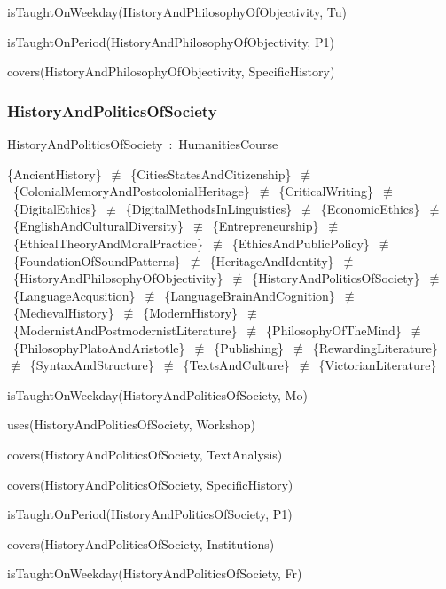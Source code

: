 \documentclass{article}
\begin{document}
isTaughtOnWeekday(HistoryAndPhilosophyOfObjectivity, Tu)

isTaughtOnPeriod(HistoryAndPhilosophyOfObjectivity, P1)

covers(HistoryAndPhilosophyOfObjectivity, SpecificHistory)

\subsubsection*{HistoryAndPoliticsOfSociety}

HistoryAndPoliticsOfSociety~:~HumanitiesCourse

\{AncientHistory\}~\ensuremath{\not\equiv}~\{CitiesStatesAndCitizenship\}~\ensuremath{\not\equiv}~\{ColonialMemoryAndPostcolonialHeritage\}~\ensuremath{\not\equiv}~\{CriticalWriting\}~\ensuremath{\not\equiv}~\{DigitalEthics\}~\ensuremath{\not\equiv}~\{DigitalMethodsInLinguistics\}~\ensuremath{\not\equiv}~\{EconomicEthics\}~\ensuremath{\not\equiv}~\{EnglishAndCulturalDiversity\}~\ensuremath{\not\equiv}~\{Entrepreneurship\}~\ensuremath{\not\equiv}~\{EthicalTheoryAndMoralPractice\}~\ensuremath{\not\equiv}~\{EthicsAndPublicPolicy\}~\ensuremath{\not\equiv}~\{FoundationOfSoundPatterns\}~\ensuremath{\not\equiv}~\{HeritageAndIdentity\}~\ensuremath{\not\equiv}~\{HistoryAndPhilosophyOfObjectivity\}~\ensuremath{\not\equiv}~\{HistoryAndPoliticsOfSociety\}~\ensuremath{\not\equiv}~\{LanguageAcqusition\}~\ensuremath{\not\equiv}~\{LanguageBrainAndCognition\}~\ensuremath{\not\equiv}~\{MedievalHistory\}~\ensuremath{\not\equiv}~\{ModernHistory\}~\ensuremath{\not\equiv}~\{ModernistAndPostmodernistLiterature\}~\ensuremath{\not\equiv}~\{PhilosophyOfTheMind\}~\ensuremath{\not\equiv}~\{PhilosophyPlatoAndAristotle\}~\ensuremath{\not\equiv}~\{Publishing\}~\ensuremath{\not\equiv}~\{RewardingLiterature\}~\ensuremath{\not\equiv}~\{SyntaxAndStructure\}~\ensuremath{\not\equiv}~\{TextsAndCulture\}~\ensuremath{\not\equiv}~\{VictorianLiterature\}

isTaughtOnWeekday(HistoryAndPoliticsOfSociety, Mo)

uses(HistoryAndPoliticsOfSociety, Workshop)

covers(HistoryAndPoliticsOfSociety, TextAnalysis)

covers(HistoryAndPoliticsOfSociety, SpecificHistory)

isTaughtOnPeriod(HistoryAndPoliticsOfSociety, P1)

covers(HistoryAndPoliticsOfSociety, Institutions)

isTaughtOnWeekday(HistoryAndPoliticsOfSociety, Fr)
\end{document}

